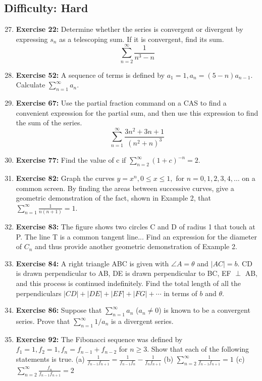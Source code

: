 \documentclass[12pt, a4paper]{article}
\begin{document}
\subsection*{Difficulty: Hard}
\begin{enumerate}
    \setcounter{enumi}{26}
    \item \textbf{Exercise 22:} Determine whether the series is convergent or divergent by expressing $s_n$ as a telescoping sum. If it is convergent, find its sum.
    \[ \sum_{n=2}^{\infty} \frac{1}{n^3 - n} \]

    \item \textbf{Exercise 52:} A sequence of terms is defined by $a_1=1, a_n = (5-n)a_{n-1}$. Calculate $\sum_{n=1}^{\infty} a_n$.

    \item \textbf{Exercise 67:} Use the partial fraction command on a CAS to find a convenient expression for the partial sum, and then use this expression to find the sum of the series.
    \[ \sum_{n=1}^{\infty} \frac{3n^2 + 3n + 1}{(n^2+n)^3} \]

    \item \textbf{Exercise 77:} Find the value of c if $\sum_{n=2}^{\infty} (1+c)^{-n} = 2$.
    
    \item \textbf{Exercise 82:} Graph the curves $y=x^n, 0 \le x \le 1,$ for $n=0, 1, 2, 3, 4, \dots$ on a common screen. By finding the areas between successive curves, give a geometric demonstration of the fact, shown in Example 2, that $\sum_{n=1}^{\infty} \frac{1}{n(n+1)} = 1$.
    
    \item \textbf{Exercise 83:} The figure shows two circles C and D of radius 1 that touch at P. The line T is a common tangent line... Find an expression for the diameter of $C_n$ and thus provide another geometric demonstration of Example 2.

    \item \textbf{Exercise 84:} A right triangle ABC is given with $\angle A = \theta$ and $|AC| = b$. CD is drawn perpendicular to AB, DE is drawn perpendicular to BC, EF $\perp$ AB, and this process is continued indefinitely. Find the total length of all the perpendiculars $|CD| + |DE| + |EF| + |FG| + \cdots$ in terms of $b$ and $\theta$.
    
    \item \textbf{Exercise 86:} Suppose that $\sum_{n=1}^{\infty} a_n$ ($a_n \ne 0$) is known to be a convergent series. Prove that $\sum_{n=1}^{\infty} 1/a_n$ is a divergent series.
    
    \item \textbf{Exercise 92:} The Fibonacci sequence was defined by $f_1=1, f_2=1, f_n = f_{n-1} + f_{n-2}$ for $n \ge 3$. Show that each of the following statements is true.
    (a) $\frac{1}{f_{n-1}f_{n+1}} = \frac{1}{f_{n-1}f_n} - \frac{1}{f_n f_{n+1}}$
    (b) $\sum_{n=2}^{\infty} \frac{1}{f_{n-1}f_{n+1}} = 1$
    (c) $\sum_{n=2}^{\infty} \frac{f_n}{f_{n-1}f_{n+1}} = 2$

\end{enumerate}
\end{document}
